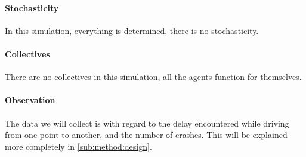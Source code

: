 \paragraph{Stochasticity} 
In this simulation, everything is determined, there is no stochasticity.

\paragraph{Collectives} 
There are no collectives in this simulation, all the agents function for themselves.

\paragraph{Observation} 
The data we will collect is with regard to the delay encountered while driving from one point to another, and the number of crashes. This will be explained more completely in \cref{sub:method:design}.


